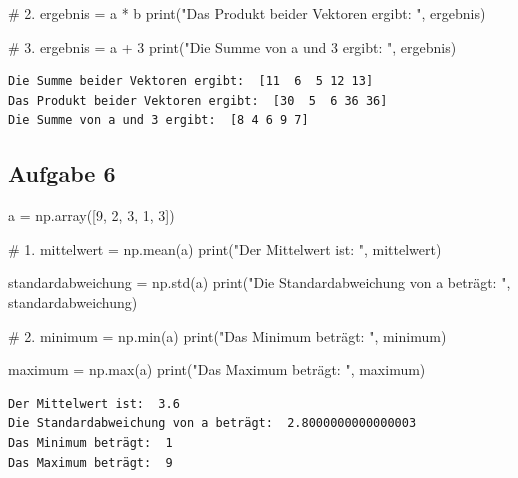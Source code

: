 \documentclass[
  letterpaper,
  DIV=11,
  numbers=noendperiod]{scrreprt}
\newenvironment{Shaded}{\begin{snugshade}}{\end{snugshade}}
\newcommand{\BuiltInTok}[1]{\textcolor[rgb]{0.00,0.23,0.31}{#1}}
\newcommand{\CommentTok}[1]{\textcolor[rgb]{0.37,0.37,0.37}{#1}}
\newcommand{\DecValTok}[1]{\textcolor[rgb]{0.68,0.00,0.00}{#1}}
\newcommand{\NormalTok}[1]{\textcolor[rgb]{0.00,0.23,0.31}{#1}}
\newcommand{\OperatorTok}[1]{\textcolor[rgb]{0.37,0.37,0.37}{#1}}
\newcommand{\StringTok}[1]{\textcolor[rgb]{0.13,0.47,0.30}{#1}}
\begin{document}
\begin{tcolorbox}
\begin{Shaded}
\begin{Highlighting}[]
\CommentTok{\# 2.}
\NormalTok{ergebnis }\OperatorTok{=}\NormalTok{ a }\OperatorTok{*}\NormalTok{ b}
\BuiltInTok{print}\NormalTok{(}\StringTok{"Das Produkt beider Vektoren ergibt: "}\NormalTok{, ergebnis) }

\CommentTok{\# 3.}
\NormalTok{ergebnis }\OperatorTok{=}\NormalTok{ a }\OperatorTok{+} \DecValTok{3}
\BuiltInTok{print}\NormalTok{(}\StringTok{"Die Summe von a und 3 ergibt: "}\NormalTok{, ergebnis) }
\end{Highlighting}
\end{Shaded}

\begin{verbatim}
Die Summe beider Vektoren ergibt:  [11  6  5 12 13]
Das Produkt beider Vektoren ergibt:  [30  5  6 36 36]
Die Summe von a und 3 ergibt:  [8 4 6 9 7]
\end{verbatim}

\subsection*{Aufgabe 6}\label{aufgabe-6-1}

\begin{Shaded}
\begin{Highlighting}[]
\NormalTok{a }\OperatorTok{=}\NormalTok{ np.array([}\DecValTok{9}\NormalTok{, }\DecValTok{2}\NormalTok{, }\DecValTok{3}\NormalTok{, }\DecValTok{1}\NormalTok{, }\DecValTok{3}\NormalTok{])}

\CommentTok{\# 1.}
\NormalTok{mittelwert }\OperatorTok{=}\NormalTok{ np.mean(a)}
\BuiltInTok{print}\NormalTok{(}\StringTok{"Der Mittelwert ist: "}\NormalTok{, mittelwert)}

\NormalTok{standardabweichung }\OperatorTok{=}\NormalTok{ np.std(a)}
\BuiltInTok{print}\NormalTok{(}\StringTok{"Die Standardabweichung von a beträgt: "}\NormalTok{, standardabweichung) }

\CommentTok{\# 2.}
\NormalTok{minimum }\OperatorTok{=}\NormalTok{ np.}\BuiltInTok{min}\NormalTok{(a)}
\BuiltInTok{print}\NormalTok{(}\StringTok{"Das Minimum beträgt: "}\NormalTok{, minimum)}

\NormalTok{maximum }\OperatorTok{=}\NormalTok{ np.}\BuiltInTok{max}\NormalTok{(a)}
\BuiltInTok{print}\NormalTok{(}\StringTok{"Das Maximum beträgt: "}\NormalTok{, maximum)}
\end{Highlighting}
\end{Shaded}

\begin{verbatim}
Der Mittelwert ist:  3.6
Die Standardabweichung von a beträgt:  2.8000000000000003
Das Minimum beträgt:  1
Das Maximum beträgt:  9
\end{verbatim}


\end{tcolorbox}
\end{document}
